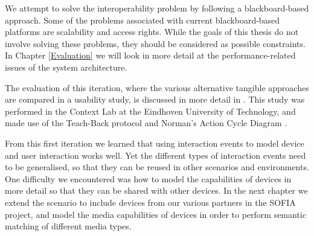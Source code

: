 We attempt to solve the interoperability problem by following a blackboard-based approach. Some of the problems associated with current blackboard-based platforms are scalability and access rights. While the goals of this thesis do not involve solving these problems, they should be considered as possible constraints. In Chapter \ref{Evaluation} we will look in more detail at the performance-related issues of the system architecture. 

The evaluation of this iteration, where the various alternative tangible approaches are compared in a usability study, is discussed in more detail in \cite{Kwak2011}. This study was performed in the Context Lab at the Eindhoven University of Technology, and made use of the Teach-Back protocol \cite{VanDerVeer2003} and Norman's Action Cycle Diagram \cite{Norman1998}.

From this first iteration we learned that using interaction events to model device and user interaction works well. Yet the different types of interaction events need to be generalised, so that they can be reused in other scenarios and environments. One difficulty we encountered was how to model the capabilities of devices in more detail so that they can be shared with other devices. In the next chapter we extend the scenario to include devices from our various partners in the \ac{SOFIA} project, and model the media capabilities of devices in order to perform semantic matching of different media types.  



% 

